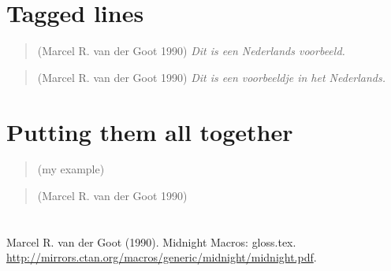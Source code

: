 \documentclass[a4paper]{ltxdoc}
\begin{document}
\section{Tagged lines}

\begin{quote}
\begin{taggedline}{(Marcel R. van der Goot 1990)}
\textdutch{\textit{Dit is een Nederlands voorbeeld.}}
\end{taggedline}
\end{quote}

\begin{quote}
\begin{taggedline}{(Marcel R. van der Goot 1990)}
\textdutch{\textit{Dit is een voorbeeldje in het Nederlands.}}
\end{taggedline}
\end{quote}

\section{Putting them all together}

\begin{quote}
\begin{taggedline}{(my
example)}
\begin{pairingline}
\end{pairingline}
\end{taggedline}
\end{quote}

\begin{quote}
\begin{taggedline}{(Marcel
R. van der Goot 1990)}
\begin{pairingline}
\end{pairingline}
\end{taggedline}
\end{quote}

\section*{\refname}
\begin{hangingpar}
Marcel R. van der Goot (1990). Midnight Macros: \textsf{gloss.tex}.
\url{http://mirrors.ctan.org/macros/generic/midnight/midnight.pdf}.
\end{hangingpar}
\end{document}
